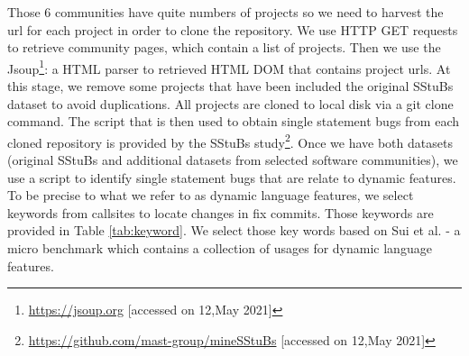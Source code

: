 \documentclass[sigconf,review,anonymous]{acmart}
\begin{document}
Those 6 communities have quite numbers of projects so we need to harvest the url for each project in order to clone the repository. We use HTTP GET requests to retrieve community pages, which contain a list of projects. Then we use the Jsoup\footnote{\url{https://jsoup.org} [accessed on 12,May 2021]}: a HTML parser to retrieved HTML DOM that contains project urls. At this stage, we remove some projects that have been included the original SStuBs dataset to avoid duplications. All projects are cloned to local disk via a git clone command.  
The script that is then used to obtain single statement bugs from each cloned repository is provided by the SStuBs study\footnote{\url{https://github.com/mast-group/mineSStuBs} [accessed on 12,May 2021]}.  Once we have both datasets (original SStuBs and additional datasets from selected software communities), we use a script to identify single statement bugs that are relate to dynamic features. To be precise to what we refer to as dynamic language features, we select keywords from callsites to locate changes in fix commits. Those keywords are provided in Table \ref{tab:keyword}. We select those key words based on Sui et al. \cite{sui2018soundness} - a micro benchmark which contains a collection of usages for dynamic language features.
\end{document}
